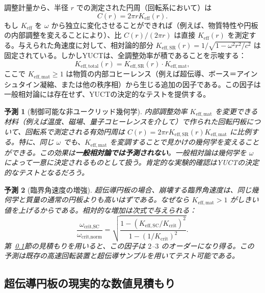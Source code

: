 \documentclass[12pt,a4paper]{article}
\newtheorem{prediction}{予測}[section]
\begin{document}
	調整計量から、半径 \(r\) での測定された円周（回転系において）は
	\[
	C(r) = 2\pi r K_{\mathrm{eff}}(r).
	\]
	もし \(K_{\mathrm{eff}}\) を \(\omega\) から独立に変化させることができれば（例えば、物質特性や円板の内部調整を変えることにより）、比 \(C(r)/(2\pi r)\) は直接 \(K_{\mathrm{eff}}(r)\) を測定する。与えられた角速度に対して、相対論的部分 \(K_{\mathrm{eff,SR}}(r) = 1/\sqrt{1-\omega^2 r^2/c^2}\) は固定されている。しかしYUCTは、全調整効率が積であることを示唆する：
	\[
	K_{\mathrm{eff,total}}(r) = K_{\mathrm{eff,SR}}(r) \cdot K_{\mathrm{eff,mat}},
	\]
	ここで \(K_{\mathrm{eff,mat}} \ge 1\) は物質の内部コヒーレンス（例えば超伝導、ボース＝アインシュタイン凝縮、または他の秩序相）から生じる追加の因子である。この因子は一般相対論には存在せず、YUCTの決定的なテストを提供する。
	
	\begin{prediction}[制御可能な非ユークリッド幾何学]
		内部調整効率 \(K_{\mathrm{eff,mat}}\) を変更できる材料（例えば温度、磁場、量子コヒーレンスを介して）で作られた回転円板について、回転系で測定される有効円周は \(C(r) = 2\pi r K_{\mathrm{eff,SR}}(r) K_{\mathrm{eff,mat}}\) に比例する。特に、同じ \(\omega\) でも、\(K_{\mathrm{eff,mat}}\) を変調することで見かけの幾何学を変えることができる。この効果は\textbf{一般相対論では予測されない}。一般相対論は幾何学を \(\omega\) によって一意に決定されるものとして扱う。肯定的な実験的確認はYUCTの決定的なテストとなるだろう。
	\end{prediction}
	
	\begin{prediction}[臨界角速度の増強]
		超伝導円板の場合、崩壊する臨界角速度は、同じ幾何学と質量の通常の円板よりも高いはずである。なぜなら \(K_{\mathrm{eff,mat}} > 1\) がしきい値を上げるからである。相対的な増加は次式で与えられる：
		\[
		\frac{\omega_{\text{crit,SC}}}{\omega_{\text{crit,norm}}} = \sqrt{ \frac{1 - (K_{\mathrm{eff,SC}}/K_{\mathrm{crit}})^2}{1 - (1/K_{\mathrm{crit}})^2} }.
		\]
		第~\ref{subsec:numerical}節の見積もりを用いると、この因子は \(2\)–\(3\) のオーダーになり得る。この予測は既存の高速回転装置と超伝導サンプルを用いてテスト可能である。
	\end{prediction}
	
	\subsection{超伝導円板の現実的な数値見積もり}
	\label{subsec:numerical}
	
\end{document}
